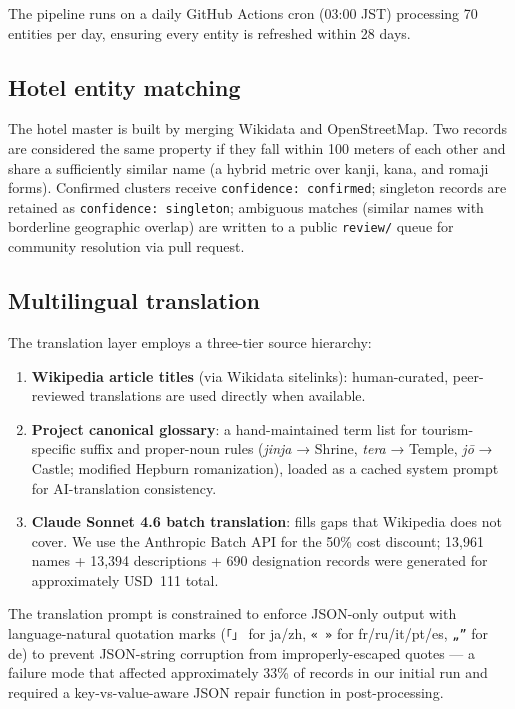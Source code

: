 \documentclass[11pt,a4paper]{article}
\begin{document}
The pipeline runs on a daily GitHub Actions cron (03:00 JST) processing
70 entities per day, ensuring every entity is refreshed within 28 days.

\subsection{Hotel entity matching}
\label{sec:matching}

The hotel master is built by merging Wikidata and OpenStreetMap. Two
records are considered the same property if they fall within 100 meters
of each other and share a sufficiently similar name (a hybrid metric
over kanji, kana, and romaji forms). Confirmed clusters receive
\texttt{confidence: confirmed}; singleton records are retained as
\texttt{confidence: singleton}; ambiguous matches (similar names with
borderline geographic overlap) are written to a public \texttt{review/}
queue for community resolution via pull request.

\subsection{Multilingual translation}
\label{sec:translation}

The translation layer employs a three-tier source hierarchy:

\begin{enumerate}
  \item \textbf{Wikipedia article titles} (via Wikidata sitelinks):
  human-curated, peer-reviewed translations are used directly when
  available.
  \item \textbf{Project canonical glossary}: a hand-maintained term
  list for tourism-specific suffix and proper-noun rules
  (\emph{jinja} → Shrine, \emph{tera} → Temple, \emph{j\=o} → Castle;
  modified Hepburn romanization), loaded as a cached system prompt for
  AI-translation consistency.
  \item \textbf{Claude Sonnet 4.6 batch translation}: fills gaps that
  Wikipedia does not cover. We use the Anthropic Batch API for the
  50\% cost discount; 13{,}961 names + 13{,}394 descriptions + 690
  designation records were generated for approximately USD~111 total.
\end{enumerate}

The translation prompt is constrained to enforce JSON-only output with
language-natural quotation marks (\texttt{「」} for ja/zh, \texttt{« »}
for fr/ru/it/pt/es, \texttt{„''} for de) to prevent JSON-string corruption
from improperly-escaped quotes — a failure mode that affected approximately
33\% of records in our initial run and required a key-vs-value-aware
JSON repair function in post-processing.
\end{document}
